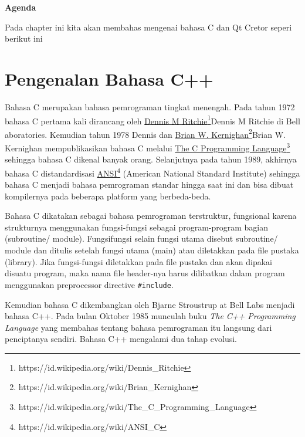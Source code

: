 \textbf{Agenda}

Pada chapter ini kita akan membahas mengenai bahasa C dan Qt Cretor 
seperi berikut ini

\minitoc

\section{Pengenalan Bahasa C++}\label{pengenalan-bahasa-cpp}



Bahasa C merupakan bahasa pemrograman tingkat menengah. Pada tahun 1972
bahasa C pertama kali dirancang oleh 
\href{https://id.wikipedia.org/wiki/Dennis_Ritchie}{Dennis M Ritchie}\footnote{https://id.wikipedia.org/wiki/Dennis\_Ritchie}{Dennis M Ritchie} di
Bell aboratories. Kemudian tahun 1978 Dennis dan 
\href{https://id.wikipedia.org/wiki/Brian_Kernighan}{Brian W. Kernighan}\footnote{https://id.wikipedia.org/wiki/Brian\_Kernighan}{Brian W. Kernighan}
mempublikasikan bahasa C melalui 
\href{https://id.wikipedia.org/wiki/The_C_Programming_Language}{The C
Programming Language}\footnote{https://id.wikipedia.org/wiki/The\_C\_Programming\_Language} sehingga bahasa C dikenal banyak orang.
Selanjutnya pada tahun 1989, akhirnya bahasa C distandardisasi 
\href{https://id.wikipedia.org/wiki/ANSI_C}{ANSI}\footnote{https://id.wikipedia.org/wiki/ANSI\_C} (American National
Standard Institute) sehingga bahasa C menjadi bahasa pemrograman standar
hingga saat ini dan bisa dibuat kompilernya pada beberapa platform yang
berbeda-beda.

Bahasa C dikatakan sebagai bahasa pemrograman terstruktur, fungsional
karena strukturnya menggunakan fungsi-fungsi sebagai program-program
bagian (subroutine/ module). Fungsifungsi selain fungsi utama disebut
subroutine/ module dan ditulis setelah fungsi utama (main) atau
diletakkan pada file pustaka (library). Jika fungsi-fungsi diletakkan
pada file pustaka dan akan dipakai disuatu program, maka nama file
header-nya harus dilibatkan dalam program menggunakan preprocessor
directive \texttt{\#include}.

Kemudian bahasa C dikembangkan oleh Bjarne Stroustrup at Bell Labs
menjadi bahasa C++. Pada bulan Oktober 1985 munculah buku \emph{The C++
Programming Language} yang membahas tentang bahasa pemrograman itu
langsung dari penciptanya sendiri. Bahasa C++ mengalami dua tahap
evolusi.


